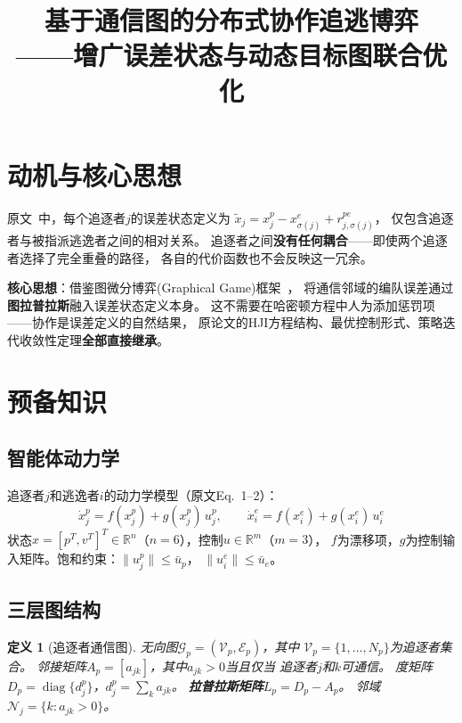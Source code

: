 \documentclass[11pt,a4paper]{article}
\title{基于通信图的分布式协作追逃博弈\\
——增广误差状态与动态目标图联合优化}
\author{}
\date{}
\newtheorem{definition}{定义}
\DeclareMathOperator{\diag}{diag}
\newcommand{\R}{\mathbb{R}}
\newcommand{\ub}{\bar{u}}
\begin{document}
\maketitle
\tableofcontents
\newpage

\section{动机与核心思想}

原文~\cite{xu2024}中，每个追逐者$j$的误差状态定义为
$\tilde{x}_j = x_j^p - x_{\sigma(j)}^e + r_{j,\sigma(j)}^{pe}$，
仅包含追逐者与被指派逃逸者之间的相对关系。
追逐者之间\textbf{没有任何耦合}——即使两个追逐者选择了完全重叠的路径，
各自的代价函数也不会反映这一冗余。

\textbf{核心思想}：借鉴图微分博弈(Graphical Game)框架~\cite{lopez2020,zhou2024}，
将通信邻域的编队误差通过\textbf{图拉普拉斯}融入误差状态定义本身。
这不需要在哈密顿方程中人为添加惩罚项——协作是误差定义的自然结果，
原论文的HJI方程结构、最优控制形式、策略迭代收敛性定理\textbf{全部直接继承}。


\section{预备知识}

\subsection{智能体动力学}

追逐者$j$和逃逸者$i$的动力学模型（原文Eq.~1--2）：
\begin{equation}\label{eq:dynamics}
  \dot{x}_j^p = f(x_j^p) + g(x_j^p)\, u_j^p, \qquad
  \dot{x}_i^e = f(x_i^e) + g(x_i^e)\, u_i^e
\end{equation}
状态$x = [p^T, v^T]^T \in \R^n$（$n=6$），控制$u \in \R^m$（$m=3$），
$f$为漂移项，$g$为控制输入矩阵。饱和约束：$\|u_j^p\| \leq \ub_p$，
$\|u_i^e\| \leq \ub_e$。

\subsection{三层图结构}

\begin{definition}[追逐者通信图]\label{def:comm_graph}
  无向图$\mathcal{G}_p = (\mathcal{V}_p, \mathcal{E}_p)$，其中
  $\mathcal{V}_p = \{1,\ldots,N_p\}$为追逐者集合。
  邻接矩阵$A_p = [a_{jk}]$，其中$a_{jk} > 0$当且仅当
  追逐者$j$和$k$可通信。
  度矩阵$D_p = \diag\{d_j^p\}$，$d_j^p = \sum_k a_{jk}$。
  \textbf{拉普拉斯矩阵}$L_p = D_p - A_p$。
  邻域$\mathcal{N}_j = \{k : a_{jk} > 0\}$。
\end{definition}
\end{document}
